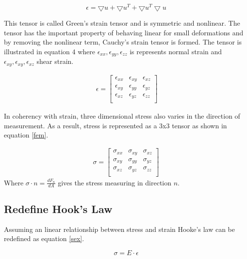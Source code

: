 \documentclass[10pt,a4paper]{article}
\begin{document}
\begin{equation}\label{tre}
    \epsilon = \bigtriangledown u + \bigtriangledown u^{T} + \bigtriangledown u^{T} \bigtriangledown u
\end{equation}

This tensor is called Green’s strain tensor and is symmetric and nonlinear. The tensor has the important property of behaving linear for small deformations
and by removing the nonlinear term, Cauchy’s strain tensor is formed. The tensor is illustrated in equation 4 where $\epsilon_{xx}, \epsilon_{yy}, \epsilon_{zz}$ is represents normal strain and $\epsilon_{xy}, \epsilon_{xy}, \epsilon_{xz}$  shear strain.

\begin{eqnarray}\
\epsilon =  \left[ \begin{array}{cccc}
\epsilon_{xx} & \epsilon_{xy} & \epsilon_{xz} \\
\epsilon_{xy} & \epsilon_{yy} & \epsilon_{yz} \\
\epsilon_{xz} & \epsilon_{yz} & \epsilon_{zz} \\
 \end{array} \right]
\end{eqnarray}

In coherency with strain, three dimensional stress also varies in the direction of measurement. As a result, stress is represented as a 3x3 tensor as shown in equation \ref{fem}.

\begin{eqnarray}\label{fem}
\sigma =  \left[ \begin{array}{cccc}
\sigma_{xx} & \sigma_{xy} & \sigma_{xz} \\
\sigma_{xy} & \sigma_{yy} & \sigma_{yz} \\
\sigma_{xz} & \sigma_{yz} & \sigma_{zz} \\
 \end{array} \right]
\end{eqnarray}
Where $\sigma \cdot n = \frac{dF_{n}}{dA}$ gives the stress measuring in direction $n$.

\subsection{Redefine Hook's Law}
Assuming an linear relationship between stress and strain Hooke's law can be redefined as equation \ref{sex}.

\begin{equation}\label{sex}
    \sigma = E \cdot \epsilon
\end{equation}
\end{document}
